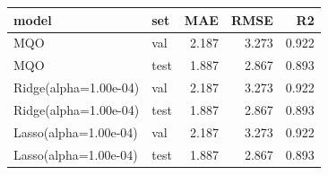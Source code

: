 \begin{tabular}{llrrr}
\toprule
model & set & MAE & RMSE & R2 \\
\midrule
MQO & val & 2.187 & 3.273 & 0.922 \\
MQO & test & 1.887 & 2.867 & 0.893 \\
Ridge(alpha=1.00e-04) & val & 2.187 & 3.273 & 0.922 \\
Ridge(alpha=1.00e-04) & test & 1.887 & 2.867 & 0.893 \\
Lasso(alpha=1.00e-04) & val & 2.187 & 3.273 & 0.922 \\
Lasso(alpha=1.00e-04) & test & 1.887 & 2.867 & 0.893 \\
\bottomrule
\end{tabular}
